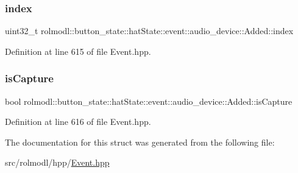 \subsubsection{\texorpdfstring{index}{index}}
{\footnotesize\ttfamily uint32\+\_\+t rolmodl\+::button\+\_\+state\+::hat\+State\+::event\+::audio\+\_\+device\+::\+Added\+::index}



Definition at line 615 of file Event.\+hpp.

\mbox{\label{structrolmodl_1_1button__state_1_1hat_state_1_1event_1_1audio__device_1_1_added_a37b24a9147380c55eeac7a8a6e8b728c}} 
\subsubsection{\texorpdfstring{isCapture}{isCapture}}
{\footnotesize\ttfamily bool rolmodl\+::button\+\_\+state\+::hat\+State\+::event\+::audio\+\_\+device\+::\+Added\+::is\+Capture}



Definition at line 616 of file Event.\+hpp.



The documentation for this struct was generated from the following file\+:\begin{DoxyCompactItemize}
\item 
src/rolmodl/hpp/\mbox{\hyperlink{_event_8hpp}{Event.\+hpp}}\end{DoxyCompactItemize}
